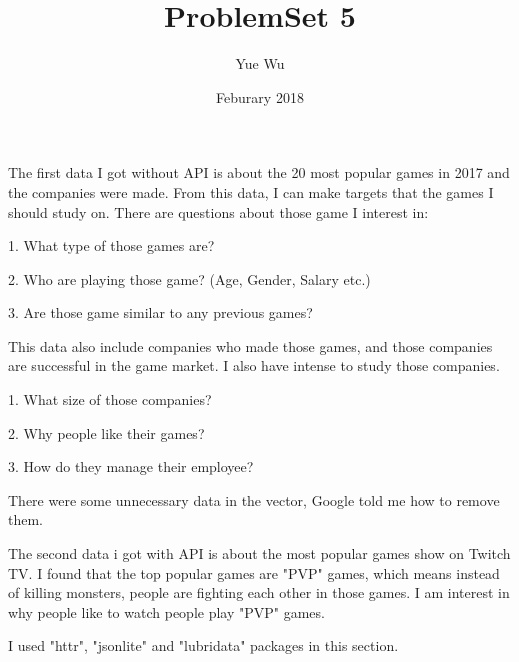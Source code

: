 \documentclass{article}
\title{ProblemSet 5}
\author{Yue Wu}
\date{Feburary 2018}
\begin{document}
\maketitle

The first data I got without API is about the 20 most popular games in 2017 and the companies were made. 
From this data, I can make targets that the games I should study on. There are questions about those game I interest in:

1. What type of those games are?

2. Who are playing those game? (Age, Gender, Salary etc.)

3. Are those game similar to any previous games?

This data also include companies who made those games, and those companies are successful in the game market.
I also have intense to study those companies.

1. What size of those companies?

2. Why people like their games?

3. How do they manage their employee?

There were some unnecessary data in the vector, Google told me how to remove them.

The second data i got with API is about the most popular games show on Twitch TV. I found that the top popular games are "PVP" games, which means instead of killing monsters, people are fighting each other in those games. I am interest in why people like to watch people play "PVP" games. 

I used "httr", "jsonlite" and "lubridata" packages in this section. 
\end{document}
